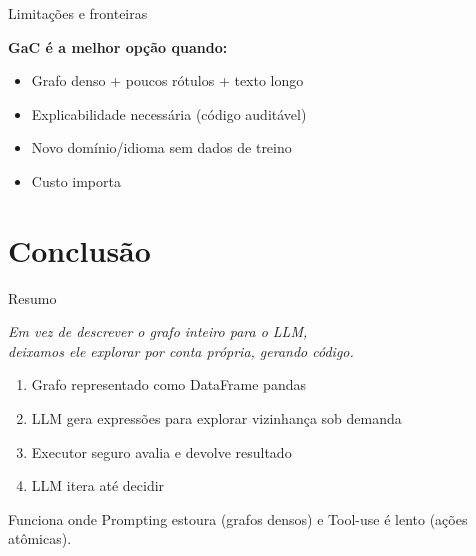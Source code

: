 \documentclass{beamer}
\begin{document}
\begin{frame}{Limitações e fronteiras}

  \vspace{0.5em}
  \textbf{GaC é a melhor opção quando:}
  \begin{itemize}
    \item Grafo denso + poucos rótulos + texto longo
    \item Explicabilidade necessária (código auditável)
    \item Novo domínio/idioma sem dados de treino
    \item Custo importa
  \end{itemize}

\end{frame}

\section*{Conclusão}
\begin{frame}{Resumo}
  \begin{center}
    \large
    \emph{Em vez de descrever o grafo inteiro para o LLM,\\
    deixamos ele explorar por conta própria, gerando código.}
  \end{center}

  \vspace{1em}
  \begin{enumerate}
    \item Grafo representado como DataFrame pandas
    \item LLM gera expressões para explorar vizinhança sob demanda
    \item Executor seguro avalia e devolve resultado
    \item LLM itera até decidir
  \end{enumerate}

  \vspace{0.5em}
  Funciona onde Prompting estoura (grafos densos) e Tool-use é lento (ações atômicas).
\end{frame}
\end{document}
